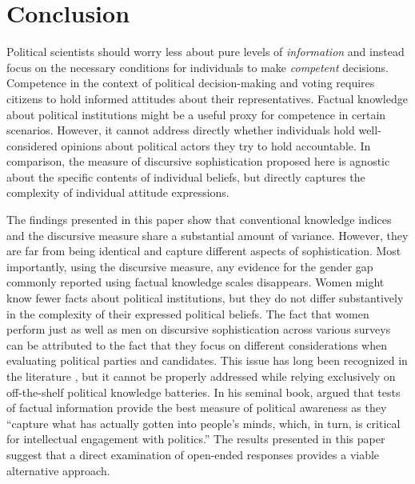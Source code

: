 \section*{Conclusion}

Political scientists should worry less about pure levels of \textit{information} and instead focus on the necessary conditions for individuals to make \textit{competent} decisions. Competence in the context of political decision-making and voting requires citizens to hold informed attitudes about their representatives. Factual knowledge about political institutions might be a useful proxy for competence in certain scenarios. However, it cannot address directly whether individuals hold well-considered opinions about political actors they try to hold accountable. In comparison, the measure of discursive sophistication proposed here is agnostic about the specific contents of individual beliefs, but directly captures the complexity of individual attitude expressions.

The findings presented in this paper show that conventional knowledge indices and the discursive measure share a substantial amount of variance. However, they are far from being identical and capture different aspects of sophistication. Most importantly, using the discursive measure, any evidence for the gender gap commonly reported using factual knowledge scales disappears. Women might know fewer facts about political institutions, but they do not differ substantively in the complexity of their expressed political beliefs. The fact that women perform just as well as men on discursive sophistication across various surveys can be attributed to the fact that they focus on different considerations when evaluating political parties and candidates. This issue has long been recognized in the literature \citep[e.g.,][]{graber2001processing,dolan2011women}, but it cannot be properly addressed while relying exclusively on off-the-shelf political knowledge batteries. In his seminal book, \citet[21]{zaller1992nature} argued that tests of factual information provide the best measure of political awareness as they ``capture what has actually gotten into people's minds, which, in turn, is critical for intellectual engagement with politics.'' The results presented in this paper suggest that a direct examination of open-ended responses provides a viable alternative approach.